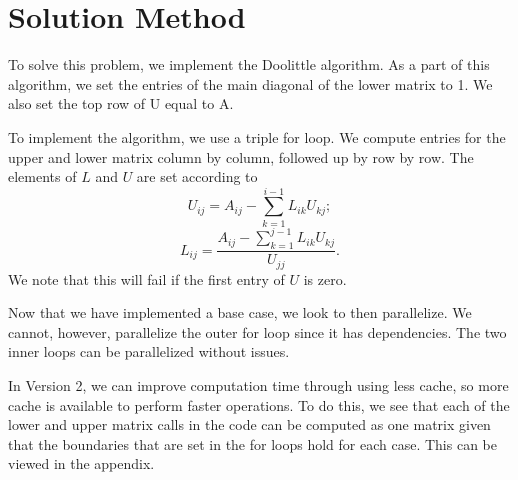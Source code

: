 \section{Solution Method}
To solve this problem, we implement the Doolittle algorithm. As a part of this algorithm, we set the entries of the main diagonal of the lower matrix to 1. We also set the top row of U equal to A.

To implement the algorithm, we use a triple for loop. We compute entries for the upper and lower matrix column by column, followed up by row by row. The elements of $L$ and $U$ are set according to
$$U_{ij} = A_{ij} - \sum_{k = 1}^{i - 1}L_{ik}U_{kj};$$
$$L_{ij} = \frac{A_{ij} - \sum_{k=1}^{j-1}L_{ik}U_{kj}}{U_{jj}}.$$
We note that this will fail if the first entry of $U$ is zero.

Now that we have implemented a base case, we look to then parallelize. We cannot, however, parallelize the outer for loop since it has dependencies. The two inner loops can be parallelized without issues.

In Version 2, we can improve computation time through using less cache, so more cache is available to perform faster operations. To do this, we see that each of the lower and upper matrix calls in the code can be computed as one matrix given that the boundaries that are set in the for loops hold for each case. This can be viewed in the appendix.

